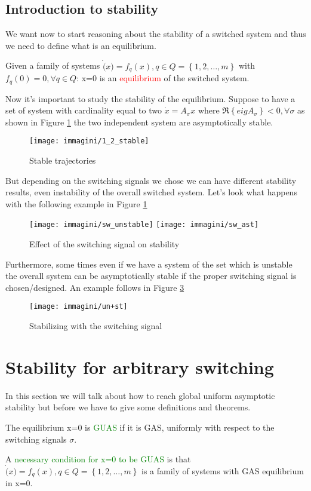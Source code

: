 \subsection{Introduction to stability} \label{introstab}
We want now to start reasoning about the stability of a switched system and thus we need to define what is an equilibrium.
\begin{defn}[Equilibrium]
	Given a family of systems $\dot(x)=f_q(x), q\in Q=\left\{1,2,\dots,m\right\}$ with $f_q(0)=0, \forall q \in Q$: x=0 is an \textcolor{red}{equilibrium} of the switched system.
\end{defn}
Now it's important to study the stability of the equilibrium. Suppose to have a set of system with cardinality equal to two $\dot{x}=A_{\sigma}x$ where $\Re\left\{eigA_{\sigma}\right\}<0, \forall \sigma$ as shown in Figure \ref{fig:12stable} the two independent system are asymptotically stable.
\begin{figure}[H]
	\centering
	\texttt{[image: immagini/1\_2\_stable]}
	\caption{Stable trajectories}
	\label{fig:12stable}
\end{figure}
But depending on the switching signals we chose we can have different stability results, even instability of the overall switched system. Let's look what happens with the following example in Figure \ref{fig:12stable}
\begin{figure}[H]
	\centering
	\texttt{[image: immagini/sw\_unstable]}
	\texttt{[image: immagini/sw\_ast]}
	\caption{Effect of the switching signal on stability}
	\label{fig:swunstable}
\end{figure}
Furthermore, some times even if we have a system of the set which is unstable the overall system can be asymptotically stable if the proper switching signal is chosen/designed. An example follows in Figure \ref{fig:unst}
\begin{figure}[H]
	\centering
	\texttt{[image: immagini/un+st]}
	\caption{Stabilizing with the switching signal}
	\label{fig:unst}
\end{figure}
\section{Stability for arbitrary switching}\label{stab-arb-sw}
In this section we will talk about how to reach global uniform asymptotic stability but before we have to give some definitions and theorems.

\begin{defn}
	The equilibrium x=0 is \textcolor{green}{GUAS} if it is GAS, uniformly with respect to the switching signals $\sigma$.
\end{defn}
A \textcolor{green}{necessary condition for x=0 to be GUAS} is that $\dot(x)=f_q(x), q\in Q=\left\{1,2,\dots,m\right\}$ is a family of systems with GAS equilibrium in x=0.

